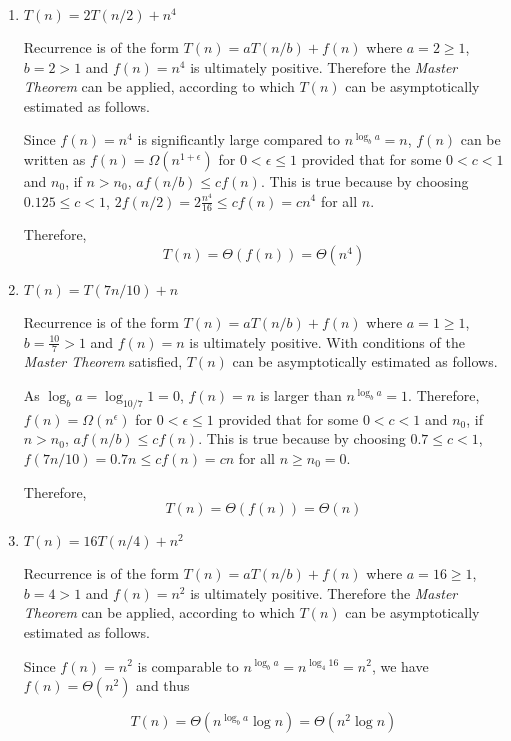 \begin{enumerate}[label=(\alph*)]
\item $T(n) = 2T(n/2) + n^4$

Recurrence is of the form $T(n) = aT(n/b)+f(n)$ where $a=2 \geq 1$, $b=2 > 1$ and $f(n) = n^4$ is ultimately positive. Therefore the \emph{Master Theorem} can be applied, according to which $T(n)$ can be asymptotically estimated as follows.

Since $f(n) = n^4$ is significantly large compared to $n^{\log_b a}=n$, $f(n)$ can be written as $f(n) = \Omega(n^{1+\epsilon})$ for $0 < \epsilon \leq 1$ provided that for some $0<c<1$ and $n_0$, if $n > n_0$, $af(n/b) \leq c f(n)$. This is true because by choosing $0.125 \leq c < 1$, $2f(n/2)=2\frac{n^4}{16}\leq cf(n)=cn^4$ for all $n$.

Therefore,
\begin{equation}
T(n) = \Theta(f(n)) = \Theta(n^4)
\end{equation}

\item $T(n) = T(7n/10) + n$

Recurrence is of the form $T(n) = aT(n/b) + f(n)$ where $a = 1 \geq 1$, $b = \frac{10}{7} > 1$ and $f(n) = n$ is ultimately positive. With conditions of the \emph{Master Theorem} satisfied, $T(n)$ can be asymptotically estimated as follows.

As $\log_b a = \log_{10/7} 1 = 0$, $f(n) = n$ is larger than $n^{\log_b a} = 1$. Therefore, $f(n) = \Omega(n^\epsilon)$ for $0 < \epsilon \leq 1$ provided that for some $0<c<1$ and $n_0$, if $n > n_0$, $af(n/b) \leq c f(n)$. This is true because by choosing $0.7 \leq c < 1$, $f(7n/10) = 0.7n \leq cf(n) = cn$ for all $n \geq n_0 = 0$. 

Therefore,
\begin{equation}
T(n) = \Theta(f(n)) = \Theta(n)
\end{equation}

\item $T(n) = 16T(n/4) + n^2$

Recurrence is of the form $T(n) = aT(n/b)+f(n)$ where $a=16 \geq 1$, $b=4 > 1$ and $f(n) = n^2$ is ultimately positive. Therefore the \emph{Master Theorem} can be applied, according to which $T(n)$ can be asymptotically estimated as follows.

Since $f(n) = n^2$ is comparable to $n^{\log_b a}=n^{\log_4 16}=n^2$, we have $ f(n) = \Theta(n^2)$ and thus

\begin{equation}
T(n) = \Theta(n^{\log_b a}\log n) = \Theta(n^2\log n)
\end{equation}


\end{enumerate}
